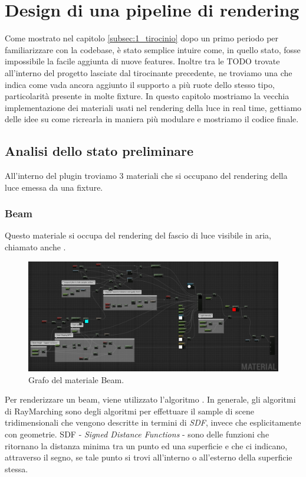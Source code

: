 \documentclass[main.tex]{subfiles}
\begin{document}
\sloppy


\vspace{1.0cm}

\section{Design di una pipeline di rendering}\label{sec:RenderingPipeline}
Come mostrato nel capitolo \ref{subsec:1_tirocinio} dopo un primo periodo per familiarizzare con la codebase, è stato semplice intuire come, in quello stato, fosse impossibile la facile aggiunta di nuove features. Inoltre tra le TODO trovate all'interno del progetto lasciate dal tirocinante precedente, ne troviamo una che indica come vada ancora aggiunto il supporto a più ruote dello stesso tipo, particolarità presente in molte fixture. In questo capitolo mostriamo la vecchia implementazione dei materiali usati nel rendering della luce in real time, gettiamo delle idee su come ricrearla in maniera più modulare e mostriamo il codice finale.

\subsection{Analisi dello stato preliminare}\label{subsec:2_oldImplementation}
All'interno del plugin troviamo 3 materiali che si occupano del rendering della luce emessa da una fixture.
\subsubsection{Beam}\label{subsec:2_1_beam}
Questo materiale si occupa del rendering del fascio di luce visibile in aria, chiamato anche .
\begin{figure}[H]
    \centering
    \includegraphics[width=1\linewidth]{img/renderingPipeline/BeamMaterialFull.jpg}
    \caption{Grafo del materiale Beam.}
    \label{fig:2_beamGraphFull}
\end{figure}
\noindent Per renderizzare un beam, viene utilizzato l'algoritmo . In generale, gli algoritmi di RayMarching \cite{RayMarching} sono degli algoritmi per effettuare il sample di scene tridimensionali che vengono descritte in termini di \textit{SDF}, invece che esplicitamente con geometrie. SDF - \textit{Signed Distance Functions} - sono delle funzioni che ritornano la distanza minima tra un punto ed una superficie e che ci indicano, attraverso il segno, se tale punto si trovi all'interno o all'esterno della superficie stessa.\newline
\end{document}
